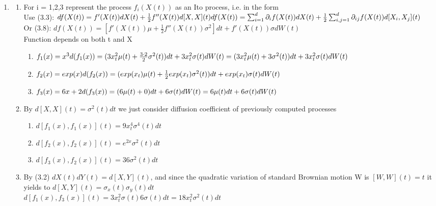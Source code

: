 \documentclass[11pt]{article}
\begin{document}
\begin{enumerate} %

\item
\begin{enumerate} %
	\item For i = 1,2,3 represent the process $f_i(X(t))$ as an Ito process, i.e. in the form
	\\[5pt] Use (3.3):  $df(X(t))=f'(X(t))dX(t) + \frac{1}{2}f''(X(t))d[X, X](t) 
	\\[5pt] df(X(t))=\sum_{i=1}^d\partial_i f(X(t))dX(t)+\frac{1}{2}\sum_{i,j=1}^d\partial_{ij}f(X(t))d[X_i,X_j](t)$
	\\[5pt] Or (3.8):  $df(X(t))=[f'(X(t))\mu+\frac{1}{2}f''(X(t))\sigma^2]dt+f'(X(t))\sigma dW(t)$
	\\[5pt] Function depends on both t and X \\
	\begin{enumerate} %
		\item $f_1(x)=x^3 
		\\[5pt] d(f_1(x))=(3x_t^2\mu(t)+\frac{3 \cdot 2}{2}\sigma^2(t))dt+3x_t^2\sigma(t)dW(t)=(3x_t^2\mu(t)+3\sigma^2(t))dt+3x_t^2\sigma(t)dW(t)$
		\\
		\item $f_2(x)=exp(x) 
		\\[5pt] d(f_2(x))=(exp(x_t)\mu(t)+\frac{1}{2}exp(x_t)\sigma^2(t))dt+exp(x_t)\sigma(t)dW(t)$
		\\
		\item $f_3(x)=6x+2 
		\\[5pt] d(f_3(x))=(6\mu(t)+0)dt+6\sigma(t)dW(t)=6\mu(t)dt+6\sigma(t)dW(t)$
		\\
	\end{enumerate}

	\item By $d[X,X](t) = \sigma^2(t)dt$ we just consider diffusion coefficient of previously computed processes
	\begin{enumerate} %
		\item $d[f_1(x),f_1(x)](t) = 9x_t^4\sigma^4(t)dt$ \\
		\item  $d[f_2(x),f_2(x)](t) = e^{2x}\sigma^2(t)dt$ \\
		\item  $d[f_3(x),f_2(x)](t) = 36\sigma^2(t)dt$ \\
	\end{enumerate}

	\item By (3.2) $dX(t)dY(t) = d[X,Y](t)$, and since the quadratic variation of standard Brownian motion W is $[W,W](t) = t$ 
	it yields to $d[X,Y](t)=\sigma_x(t)\sigma_y(t)dt$
	\\[5pt] $d[f_1(x),f_3(x)](t) = 3x_t^2 \sigma(t) 6\sigma(t) dt=18x_t^2 \sigma^2(t)dt$
\end{enumerate}

\end{enumerate}
\end{document}
